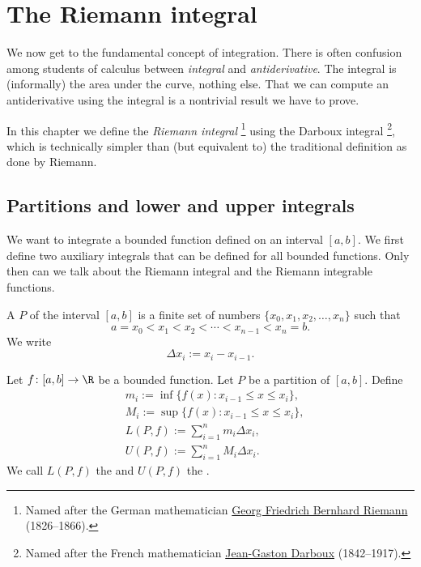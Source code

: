 \documentclass[12pt]{book}
\begin{document}
\section{The Riemann integral}
\label{sec:rint}


We now get to the fundamental concept of integration.
There is
often confusion among students of
calculus between \emph{integral} and \emph{antiderivative}.
The integral is (informally) the area under the curve, nothing else.
That we can compute an antiderivative using the integral is a nontrivial
result we have to prove.

In this chapter we define the \emph{Riemann integral}%
\footnote{Named after the German mathematician
\href{http://en.wikipedia.org/wiki/Riemann}{Georg Friedrich Bernhard Riemann}
(1826--1866).}
using the Darboux integral%
\footnote{Named after the French mathematician
\href{http://en.wikipedia.org/wiki/Darboux}{Jean-Gaston Darboux} (1842--1917).},
which is technically simpler than (but equivalent to) the traditional
definition as done by Riemann.

\subsection*{Partitions and lower and upper integrals}

We want to integrate a bounded function defined on an interval $[a,b]$.
We first define two auxiliary integrals that can be defined for all
bounded functions.
Only then can we talk about the Riemann integral and
the Riemann integrable functions.

\begin{defn}
A \emph{} $P$ of the interval $[a,b]$ is
a finite set of numbers $\{ x_0,x_1,x_2,\ldots,x_n \}$ such that
\begin{equation*}
a = x_0 < x_1 < x_2 < \cdots < x_{n-1} < x_n = b .
\end{equation*}
We write
\begin{equation*}
\Delta x_i := x_i - x_{i-1} .
\end{equation*}

\medskip

Let $f \colon [a,b] \to \R$ be a bounded function.
Let $P$ be a partition of
$[a,b]$.
Define
\begin{align*}
& m_i := \inf \{ f(x) : x_{i-1} \leq x \leq x_i \} , \\
& M_i := \sup \{ f(x) : x_{i-1} \leq x \leq x_i \} , \\
& L(P,f) :=
\sum_{i=1}^n m_i \Delta x_i , \\
& U(P,f) :=
\sum_{i=1}^n M_i \Delta x_i .
\end{align*}
We call $L(P,f)$ the \emph{} and
$U(P,f)$ the \emph{}.
\end{defn}
\end{document}
